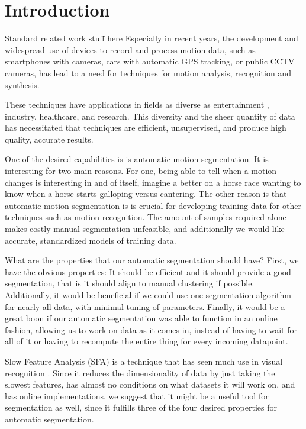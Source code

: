 \section{Introduction}

Standard related work stuff here
Especially in recent years, the development and widespread use of devices to record and process motion data, such as smartphones with cameras, cars with automatic GPS tracking, or public CCTV cameras, has lead to a need for techniques for motion analysis, recognition and synthesis.

These techniques have applications in fields as diverse as entertainment , industry, healthcare, and research. This diversity and the sheer quantity of data has necessitated that techniques are efficient, unsupervised, and produce high quality, accurate results.

One of the desired capabilities is  is automatic motion segmentation. It is interesting for two main reasons. For one, being able to tell when a motion changes is interesting in and of itself, imagine a better on a horse race wanting to know when a horse starts galloping versus cantering. The other reason is that automatic motion segmentation is is crucial for developing training data for other techniques such as motion recognition. The amount of samples required alone makes costly manual segmentation unfeasible, and additionally we would like accurate, standardized models of training data.

What are the properties that our automatic segmentation should have? First, we have the obvious properties: It should be efficient and it should provide a good segmentation, that is it should align to manual clustering if possible. Additionally, it would be beneficial if we could use one segmentation algorithm for nearly all data, with minimal tuning of parameters. Finally, it would be a great boon if our automatic segmentation was able to function in an online fashion, allowing us to work on data as it comes in, instead of having to wait for all of it or having to recompute the entire thing for every incoming datapoint.

Slow Feature Analysis (SFA) is a technique that has seen much use in visual recognition . Since it reduces the dimensionality of data by just taking the slowest features, has almost no conditions on what datasets it will work on, and has online implementations, we suggest that it might be a useful tool for segmentation as well, since it fulfills three of the four desired properties for automatic segmentation. 

